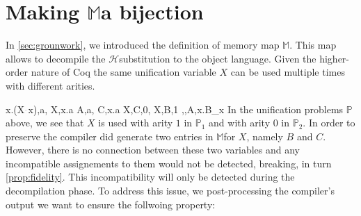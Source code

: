\documentclass[sigconf,natbib=false,review]{acmart}
\newcommand{\appsep}{\ensuremath{\textcolor{lightgray}{\cdot}}}
\newcommand{\UnifRel}{\ensuremath{\simeq}}
\newcommand{\Ue}{\ensuremath{\UnifRel_\lambda}\xspace}
\newcommand{\linkMacro}[1]{\ensuremath{#1}\texttt{-link}\xspace}
\newcommand{\linketa} {\linkMacro{\eta}}
\newcommand{\Ho}{\texorpdfstring{\ensuremath{\mathcal{H}}\xspace}{H}}
\newcommand{\lhs}{lhs\xspace}
\newcommand{\rhs}{rhs\xspace}
\newcommand{\mapStore}{\texorpdfstring{\ensuremath{\mathbb{M}}\xspace}{M}}
\newcommand{\foUnifPb}{\ensuremath{\mathbb{P}}\xspace}
\begin{document}
\begin{comment}
\paragraph{Example of \progressetadedup}

A very basic example of \linketa deduplication, is given below:
\printAlll
  {{{\lambda x.(X\appsep x),\lambda x.(Y\appsep x)}}}
  {{{A,C}}}
  {{{X,B,1},
    {Y,D,1}}}
  {{{\eta,,A,\lambda x.B_{x}},
    {\eta,,C,\lambda x.D_{x}}}}

\noindent
The result of $A \Ue{} C$ is that the two \linketa share the same \lhs.
By unifying the two \rhs we get
$\sigma = \{ A~ \mapsto C, B \mapsto D ~\}$.
In turn, given the map \mapStore, this second assignment is decompiled to
$\rho = \{~ X \mapsto Y ~\}$ as expected.
\end{comment}



\section{Making \mapStore a bijection}
\label{sec:invariant1}

In \cref{sec:grounwork}, we introduced the definition of memory map \mapStore.
This map allows to decompile the \Ho substitution to the object language.
Given the higher-order nature of Coq the same unification
variable $X$ can be used multiple times with different arities.
\begin{comment}
%
\printAlll
  {{{\lambda x.\lambda y.(X\appsep y\appsep x),\lambda x.\lambda y.x},
    {\lambda x.(f\appsep (X\appsep x)\appsep x),Y}}}
  {{{A,\lambda x.\lambda y.x},
    {D,F}}}
  {{{X,E,1},
    {Y,F,0},
    {X,C,2}}}
  {{{\eta,,D,\lambda x.(f\appsep E_{x}\appsep x)},
    {\eta,,A,\lambda x.B_{x}},
    {\eta,x,B_{x},\lambda y.C_{y x}}}}
\end{comment}
\printAlll
  {{{\lambda x.(X\appsep x),a},
    {X,\lambda x.a}}}
  {{{A,a},
    {C,\lambda x.a}}}
  {{{X,C,0},
    {X,B,1}}}
  {{{\eta,,A,\lambda x.B_{x}}}}
In the unification problems \foUnifPb above, we see that $X$ is used with arity $1$ in
$\foUnifPb_1$ and with arity $0$ in $\foUnifPb_2$. 
In order to preserve  the compiler
did generate two entries in \mapStore for $X$, namely $B$ and $C$. 
However, there is no connection between these two variables
and any incompatible assignements to them would not be detected, breaking,
in turn \cref{prop:fidelity}. This incompatibility will only be detected during the
decompilation phase.
To address this issue, we post-processing the compiler's output we want to
ensure the follwoing property:
\end{document}
